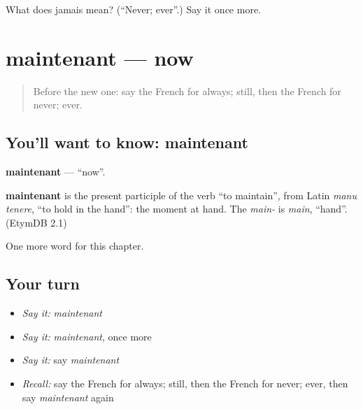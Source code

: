 \begin{tcolorbox}[breakable,colback=teal!4,colframe=teal!35!black,title={Before you move on}]
What does jamais mean? (\textquotedblleft{}Never; ever\textquotedblright{}.) Say it once more.
\end{tcolorbox}
\section[maintenant]{maintenant — now}

\label{lesson:FR-C96-maintenant}



\begin{quote}
Before the new one: say the French for always; still, then the French for never; ever.
\end{quote}

\subsection*{You'll want to know: maintenant}
\textbf{maintenant} — \textquotedblleft{}now\textquotedblright{}.

\begin{cousinweb}
\textbf{maintenant} is the present participle of the verb \textquotedblleft{}to maintain\textquotedblright{}, from Latin \emph{manu tenere}, \textquotedblleft{}to hold in the hand\textquotedblright{}: the moment at hand. The \emph{main-} is \emph{main}, \textquotedblleft{}hand\textquotedblright{}. (EtymDB 2.1)
\end{cousinweb}

\begin{grammarlens}[title={What you've built}]
One more word for this chapter.
\end{grammarlens}

\subsection*{Your turn}
\begin{itemize}
\raggedright
  \item \emph{Say it:} \emph{maintenant}
  \item \emph{Say it:} \emph{maintenant}, once more
  \item \emph{Say it:} say \emph{maintenant}
  \item \emph{Recall:} say the French for always; still, then the French for never; ever, then say \emph{maintenant} again
\end{itemize}

